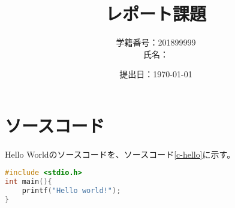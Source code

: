 \documentclass{jlreq}
\title{レポート課題}
\author{学籍番号：201899999\\氏名：\ruby{情報太郎}{じょうほうたろう}}
\date{提出日：\today}
\begin{document}
\maketitle

\section{ソースコード}

Hello Worldのソースコードを、ソースコード\ref{c-hello}に示す。

\begin{lstlisting}[language=c,caption=C言語でHello World,label=c-hello]
#include <stdio.h>
int main(){
    printf("Hello world!");
}
\end{lstlisting}
\end{document}
